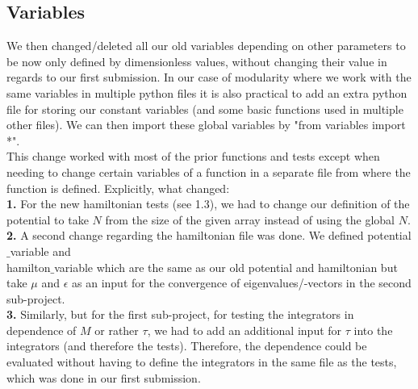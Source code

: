 \documentclass[11pt, letterpaper, onecolumn]{article}
\begin{document}
\subsection{Variables}
	We then changed/deleted all our old variables depending on other parameters to be now only defined by dimensionless values, without changing their value in regards to our first submission.
	In our case of modularity where we work with the same variables in multiple python files it is also practical to add an extra python file for storing our constant variables (and some basic functions used in multiple other files). We can then import these global variables by "from variables import *". \\
	This change worked with most of the prior functions and tests except when needing to change certain variables of a function in a separate file from where the function is defined. Explicitly, what changed: \\
	\textbf{1.} For the new hamiltonian tests (see 1.3), we had to change our definition of the potential to take $N$ from the size of the given array instead of using the global $N$.\\
	\textbf{2.} A second change regarding the hamiltonian file was done. We defined potential$\_$variable and \\hamilton$\_$variable which are the same as our old potential and hamiltonian but take $\mu$ and $\epsilon$ as an input for the convergence of eigenvalues/-vectors in the second sub-project. \\
	\textbf{3.} Similarly, but for the first sub-project, for testing the integrators in dependence of $M$ or rather $\tau$, we had to add an additional input for $\tau$ into the integrators (and therefore the tests). Therefore, the dependence could be evaluated without having to define the integrators in the same file as the tests, which was done in our first submission.
\end{document}
